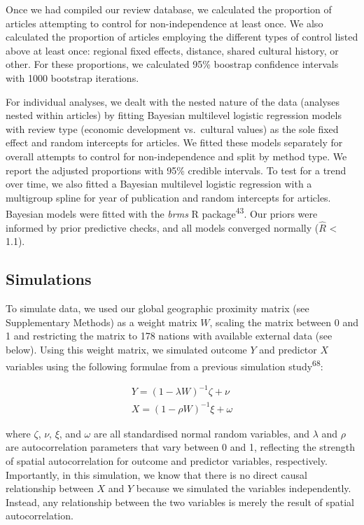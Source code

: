 \documentclass[
  english,
  man,floatsintext]{apa6}
\begin{document}
Once we had compiled our review database, we calculated the proportion of articles attempting to control for non-independence at least once. We also calculated the proportion of articles employing the different types of control listed above at least once: regional fixed effects, distance, shared cultural history, or other. For these proportions, we calculated 95\% boostrap confidence intervals with 1000 bootstrap iterations.

For individual analyses, we dealt with the nested nature of the data (analyses nested within articles) by fitting Bayesian multilevel logistic regression models with review type (economic development vs.~cultural values) as the sole fixed effect and random intercepts for articles. We fitted these models separately for overall attempts to control for non-independence and split by method type. We report the adjusted proportions with 95\% credible intervals. To test for a trend over time, we also fitted a Bayesian multilevel logistic regression with a multigroup spline for year of publication and random intercepts for articles. Bayesian models were fitted with the \emph{brms} R package\textsuperscript{43}. Our priors were informed by prior predictive checks, and all models converged normally (\(\hat{R}\) \textless{} 1.1).

\hypertarget{simulations}{%
\subsection{Simulations}\label{simulations}}

To simulate data, we used our global geographic proximity matrix (see Supplementary Methods) as a weight matrix \(W\), scaling the matrix between 0 and 1 and restricting the matrix to 178 nations with available external data (see below). Using this weight matrix, we simulated outcome \(Y\) and predictor \(X\) variables using the following formulae from a previous simulation study\textsuperscript{68}:

\[
\begin{aligned}
Y=(1-\lambda W)^{-1} \zeta + \nu \\
X=(1-\rho W)^{-1} \xi + \omega
\end{aligned}
\]

where \(\zeta\), \(\nu\), \(\xi\), and \(\omega\) are all standardised normal random variables, and \(\lambda\) and \(\rho\) are autocorrelation parameters that vary between 0 and 1, reflecting the strength of spatial autocorrelation for outcome and predictor variables, respectively. Importantly, in this simulation, we know that there is no direct causal relationship between \(X\) and \(Y\) because we simulated the variables independently. Instead, any relationship between the two variables is merely the result of spatial autocorrelation.
\end{document}
